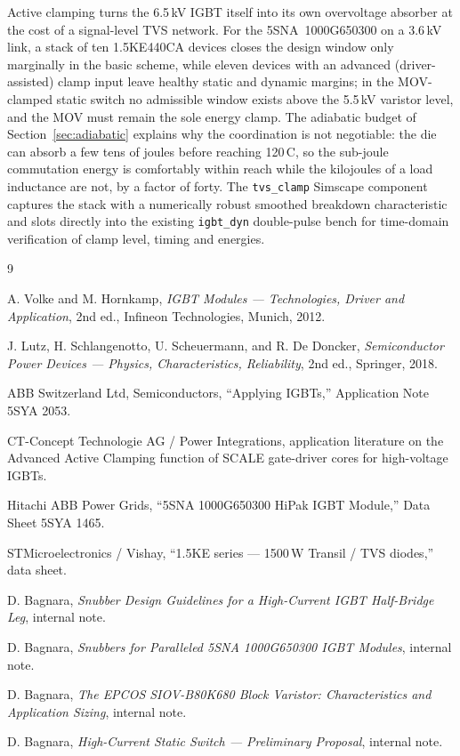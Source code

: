 \documentclass[11pt,a4paper]{article}
\begin{document}
Active clamping turns the 6.5\,kV IGBT itself into its own overvoltage
absorber at the cost of a signal-level TVS network. For the
5SNA~1000G650300 on a 3.6\,kV link, a stack of ten 1.5KE440CA devices
closes the design window only marginally in the basic scheme, while
eleven devices with an advanced (driver-assisted) clamp input leave
healthy static and dynamic margins; in the MOV-clamped static switch no
admissible window exists above the 5.5\,kV varistor level, and the MOV
must remain the sole energy clamp. The adiabatic budget of
Section~\ref{sec:adiabatic} explains why the coordination is not
negotiable: the die can absorb a few tens of joules before reaching
120\,\textdegree C, so the sub-joule commutation energy is comfortably
within reach while the kilojoules of a load inductance are not, by a
factor of forty. The \texttt{tvs\_clamp} Simscape
component captures the stack with a numerically robust smoothed
breakdown characteristic and slots directly into the existing
\texttt{igbt\_dyn} double-pulse bench for time-domain verification of
clamp level, timing and energies.

\begin{thebibliography}{9}

 A. Volke and M. Hornkamp, \emph{IGBT Modules ---
Technologies, Driver and Application}, 2nd ed., Infineon Technologies,
Munich, 2012.

 J. Lutz, H. Schlangenotto, U. Scheuermann, and
R. De Doncker, \emph{Semiconductor Power Devices --- Physics,
Characteristics, Reliability}, 2nd ed., Springer, 2018.

 ABB Switzerland Ltd, Semiconductors, ``Applying
IGBTs,'' Application Note 5SYA 2053.

 CT-Concept Technologie AG / Power Integrations,
application literature on the Advanced Active Clamping function of
SCALE gate-driver cores for high-voltage IGBTs.

 Hitachi ABB Power Grids, ``5SNA 1000G650300 HiPak IGBT
Module,'' Data Sheet 5SYA 1465.

 STMicroelectronics / Vishay, ``1.5KE series ---
1500\,W Transil / TVS diodes,'' data sheet.

 D. Bagnara, \emph{Snubber Design Guidelines for a
High-Current IGBT Half-Bridge Leg}, internal note.

 D. Bagnara, \emph{Snubbers for Paralleled 5SNA
1000G650300 IGBT Modules}, internal note.

 D. Bagnara, \emph{The EPCOS SIOV-B80K680 Block
Varistor: Characteristics and Application Sizing}, internal note.

 D. Bagnara, \emph{High-Current Static Switch ---
Preliminary Proposal}, internal note.

\end{thebibliography}
\end{document}
